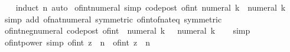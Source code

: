 \begin{isabellebody}
%
\isadelimproof
\ \ %
\endisadelimproof
%
\isatagproof
{}\isamarkupfalse%
\ {\isacharparenleft}{\kern0pt}induct\ n{\isacharparenright}{\kern0pt}\ auto%
\endisatagproof
{\isafoldproof}%
%
\isadelimproof
\isanewline
%
\endisadelimproof
\isanewline
{}\isamarkupfalse%
\ of{\isacharunderscore}{\kern0pt}int{\isacharunderscore}{\kern0pt}numeral\ {\isacharbrackleft}{\kern0pt}simp{\isacharcomma}{\kern0pt}\ code{\isacharunderscore}{\kern0pt}post{\isacharbrackright}{\kern0pt}{\isacharcolon}{\kern0pt}\ {\isachardoublequoteopen}of{\isacharunderscore}{\kern0pt}int\ {\isacharparenleft}{\kern0pt}numeral\ k{\isacharparenright}{\kern0pt}\ {\isacharequal}{\kern0pt}\ numeral\ k{\isachardoublequoteclose}\isanewline
%
\isadelimproof
\ \ %
\endisadelimproof
%
\isatagproof
{}\isamarkupfalse%
\ {\isacharparenleft}{\kern0pt}simp\ add{\isacharcolon}{\kern0pt}\ of{\isacharunderscore}{\kern0pt}nat{\isacharunderscore}{\kern0pt}numeral\ {\isacharbrackleft}{\kern0pt}symmetric{\isacharbrackright}{\kern0pt}\ of{\isacharunderscore}{\kern0pt}int{\isacharunderscore}{\kern0pt}of{\isacharunderscore}{\kern0pt}nat{\isacharunderscore}{\kern0pt}eq\ {\isacharbrackleft}{\kern0pt}symmetric{\isacharbrackright}{\kern0pt}{\isacharparenright}{\kern0pt}%
\endisatagproof
{\isafoldproof}%
%
\isadelimproof
\isanewline
%
\endisadelimproof
\isanewline
{}\isamarkupfalse%
\ of{\isacharunderscore}{\kern0pt}int{\isacharunderscore}{\kern0pt}neg{\isacharunderscore}{\kern0pt}numeral\ {\isacharbrackleft}{\kern0pt}code{\isacharunderscore}{\kern0pt}post{\isacharbrackright}{\kern0pt}{\isacharcolon}{\kern0pt}\ {\isachardoublequoteopen}of{\isacharunderscore}{\kern0pt}int\ {\isacharparenleft}{\kern0pt}{\isacharminus}{\kern0pt}\ numeral\ k{\isacharparenright}{\kern0pt}\ {\isacharequal}{\kern0pt}\ {\isacharminus}{\kern0pt}\ numeral\ k{\isachardoublequoteclose}\isanewline
%
\isadelimproof
\ \ %
\endisadelimproof
%
\isatagproof
{}\isamarkupfalse%
\ simp%
\endisatagproof
{\isafoldproof}%
%
\isadelimproof
\isanewline
%
\endisadelimproof
\isanewline
{}\isamarkupfalse%
\ of{\isacharunderscore}{\kern0pt}int{\isacharunderscore}{\kern0pt}power\ {\isacharbrackleft}{\kern0pt}simp{\isacharbrackright}{\kern0pt}{\isacharcolon}{\kern0pt}\ {\isachardoublequoteopen}of{\isacharunderscore}{\kern0pt}int\ {\isacharparenleft}{\kern0pt}z\ {\isacharcircum}{\kern0pt}\ n{\isacharparenright}{\kern0pt}\ {\isacharequal}{\kern0pt}\ of{\isacharunderscore}{\kern0pt}int\ z\ {\isacharcircum}{\kern0pt}\ n{\isachardoublequoteclose}\isanewline
%
\isadelimproof
\ \ %
\endisadelimproof

\end{isabellebody}
